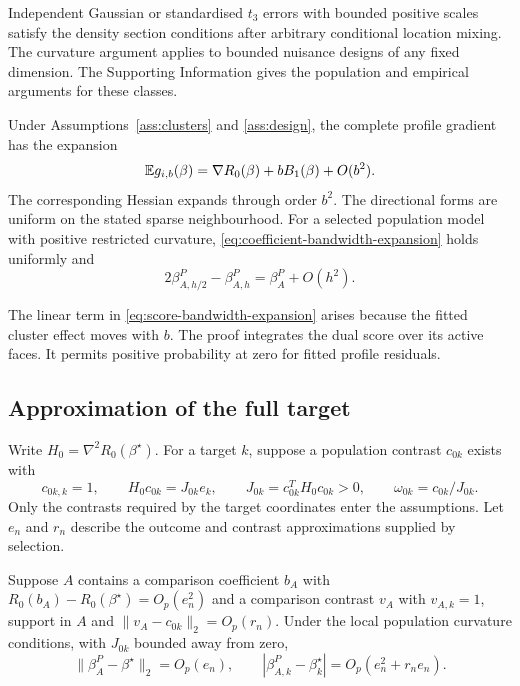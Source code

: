 Independent Gaussian or standardised $t_3$ errors with bounded positive
scales satisfy the density section conditions after arbitrary
conditional location mixing. The curvature argument applies to bounded
nuisance designs of any fixed dimension. The
Supporting Information gives the population and empirical arguments
for these classes.

\begin{theorem}\label{thm:target}
Under Assumptions~\ref{ass:clusters} and \ref{ass:design}, the complete
profile gradient has the expansion
\begin{equation}\label{eq:score-bandwidth-expansion}
 \mathbb{E} g_{i,b}(\beta)=\nabla R_0(\beta)+bB_1(\beta)+O(b^2).
\end{equation}
The corresponding Hessian expands through order $b^2$. The
directional forms are uniform on the stated sparse neighbourhood.
For a selected population model with positive restricted curvature,
\eqref{eq:coefficient-bandwidth-expansion} holds uniformly and
\begin{equation}\label{eq:paired-population-coefficient}
 2\beta_{A,h/2}^P-\beta_{A,h}^P=\beta_A^P+O(h^2).
\end{equation}
\end{theorem}

The linear term in \eqref{eq:score-bandwidth-expansion} arises because
the fitted cluster effect moves with $b$. The proof integrates the
dual score over its active faces. It permits positive probability at
zero for fitted profile residuals.

\subsection{Approximation of the full target}\label{subsec:target-theory}

Write $H_0=\nabla^2R_0(\beta^\star)$. For a target $k$, suppose a
population contrast $c_{0k}$ exists with
\begin{equation}\label{eq:population-direction}
 c_{0k,k}=1,\qquad H_0c_{0k}=J_{0k}e_k,\qquad
 J_{0k}=c_{0k}^TH_0c_{0k}>0,\qquad \omega_{0k}=c_{0k}/J_{0k}.
\end{equation}
Only the contrasts required by the target coordinates enter the
assumptions. Let $e_n$ and $r_n$ describe the outcome and contrast
approximations supplied by selection.

\begin{theorem}\label{thm:selected-target}
Suppose $A$ contains a comparison coefficient $b_A$ with
$R_0(b_A)-R_0(\beta^\star)=O_p(e_n^2)$ and a comparison contrast
$v_A$ with $v_{A,k}=1$, support in $A$ and
$\|v_A-c_{0k}\|_2=O_p(r_n)$. Under the local population curvature
conditions, with $J_{0k}$ bounded away from zero,
\begin{equation}\label{eq:selected-target-bound}
 \|\beta_A^P-\beta^\star\|_2=O_p(e_n),\qquad
 |\beta_{A,k}^P-\beta_k^\star|=O_p(e_n^2+r_ne_n).
\end{equation}
\end{theorem}

